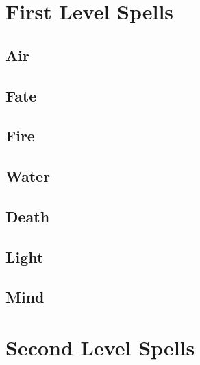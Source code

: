 \section{First Level Spells}

\begin{multicols}{2}

\subsection{Air}



\subsection{Fate}



\subsection{Fire}



\subsection{Water}



\subsection{Death}



\subsection{Light}



\subsection{Mind}



\end{multicols}

\section{Second Level Spells}

